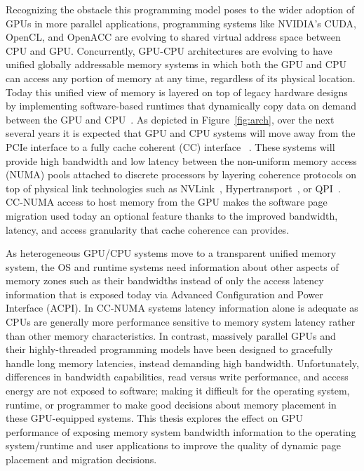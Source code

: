 Recognizing the obstacle this programming model poses to the wider adoption of
GPUs in more parallel applications, programming systems like NVIDIA's CUDA,
OpenCL, and OpenACC are evolving to shared virtual address space between CPU and
GPU. Concurrently, GPU-CPU architectures are evolving to have unified globally
addressable memory systems in which both the GPU and CPU can access any portion
of memory at any time, regardless of its physical location.  Today this unified
view of memory is layered on top of legacy hardware designs by implementing
software-based runtimes that dynamically copy data on demand between the GPU and
CPU~\cite{cuda}. As depicted in Figure~\ref{fig:arch}, over the next several
years it is expected that GPU and CPU systems will move away from the PCIe
interface to a fully cache coherent (CC) interface ~\cite{AMDHSA}. These systems
will provide high bandwidth and low latency between the non-uniform memory
access (NUMA) pools attached to discrete processors by layering coherence
protocols on top of physical link technologies such as NVLink~\cite{NVLINK},
Hypertransport~\cite{AMDHT}, or QPI~\cite{INTELQPI}.   CC-NUMA access to host
memory from the GPU makes the software page migration used today an optional
feature thanks to the improved bandwidth, latency, and access granularity that
cache coherence can provides.

As heterogeneous GPU/CPU systems move to a transparent unified memory system,
the OS and runtime systems need information about other aspects of memory zones
such as their bandwidths instead of only the access latency information that is
exposed today via Advanced Configuration and Power Interface (ACPI). In CC-NUMA
systems latency information alone is adequate as CPUs are generally more
performance sensitive to memory system latency rather than other memory
characteristics. In contrast, massively parallel GPUs and their highly-threaded
programming models have been designed to gracefully handle long memory
latencies, instead demanding high bandwidth. Unfortunately, differences in
bandwidth capabilities, read versus write performance, and access energy are not
exposed to software; making it difficult for the operating system, runtime, or
programmer to make good decisions about memory placement in these GPU-equipped
systems. This thesis explores the effect on GPU performance of exposing memory
system bandwidth information to the operating system/runtime and user
applications to improve the quality of dynamic page placement and migration
decisions.

